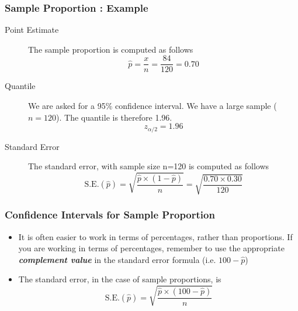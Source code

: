 \documentclass[a4]{beamer}
\begin{document}

\begin{frame}
\frametitle{ Sample Proportion : Example}


\begin{description}
\item[Point Estimate] The sample proportion is computed as follows
\[ \hat{p} = \frac{x}{n} = \frac{84}{120} = 0.70 \]
\item[Quantile] We are asked for a 95\% confidence interval. We have a large sample ($n=120$). The quantile is therefore 1.96.
\[ z_{\alpha/2} =1.96\]
\item[Standard Error] The standard error, with sample size n=120 is computed as follows
\[ \mbox{S.E.}(\hat{p}) = \sqrt{\frac{\hat{p} \times (1-\hat{p})}{n}} =  \sqrt{\frac{0.70 \times 0.30}{120}}\]

\end{description}
\end{frame}
\begin{frame}
\frametitle{Confidence Intervals for Sample Proportion}
\Large
\begin{itemize}

\item It is often easier to work in terms of percentages, rather than proportions.
If you are working in terms of percentages, remember to use the appropriate \textbf{\textit{complement value}} in the standard error formula (i.e. $100 - \hat{p}$)

\item The standard error, in the case of sample proportions, is
\[ \mbox{S.E.}(\hat{p}) = \sqrt{\frac{\hat{p}\times (100-\hat{p})}{n}}\]
\end{itemize}
\end{frame}
\end{document}
